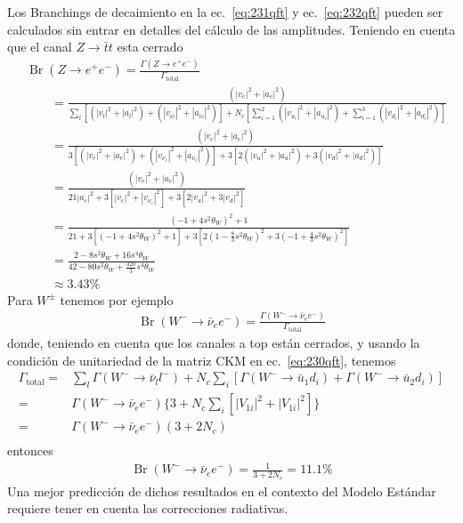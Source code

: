 \begin{frame}
Los Branchings de decaimiento en la ec.~\eqref{eq:231qft} y ec.~\eqref{eq:232qft}  pueden ser calculados sin entrar en detalles del cálculo de las amplitudes. Teniendo en cuenta que el canal $Z\to\bar{t}t$ esta cerrado
\begin{align}
  &\operatorname{Br}(Z\to e^+e^-)=\frac{\Gamma(Z\to e^+e^-)}{\Gamma_{\text{total}}}\nonumber\\
 &\qquad=\frac{(|v_e|^2+|a_e|^2)}{\sum_l[(|v_l|^2+|a_l|^2)+(|v_{\nu_l}|^2+|a_{\nu_l}|^2)]
+N_c[\sum_{i=1}^2(|v_{u_i}|^2+|a_{u_i}|^2)+\sum_{i=1}^3(|v_{d_i}|^2+|a_{d_i}|^2)]}\nonumber\\
 &\qquad=\frac{(|v_e|^2+|a_e|^2)}{3[(|v_e|^2+|a_e|^2)+(|v_{\nu_e}|^2+|a_{\nu_e}|^2)]
+3[2(|v_{u}|^2+|a_{u}|^2)+3(|v_{d}|^2+|a_{d}|^2)]}\nonumber\\
  &\qquad=\frac{(|v_e|^2+|a_e|^2)}{21|a_e|^2+3[|v_e|^2+|v_{\nu_e}|^2]
+3[2|v_{u}|^2+3|v_{d}|^2]}\nonumber\\
 &\qquad=\frac{(-1+4s^2\theta_W)^2+1}{21+3[(-1+4s^2\theta_W)^2+1]
+3[2(1-\frac{8}{3}s^2\theta_W)^2+3(-1+\frac{4}{3}s^2\theta_W)^2]}\nonumber\\
  &\qquad=\frac{2-8s^2\theta_W+16s^4\theta_W}{42-80s^2\theta_W+\frac{320}{3}s^4\theta_W}\nonumber\\
&\qquad\approx3.43\%
\end{align}
Para $W^\pm$ tenemos por ejemplo
\begin{align}
\operatorname{Br}(W^-\to\bar{\nu}_e e^-)=\frac{\Gamma(W^-\to\bar{\nu}_e e^-)}{\Gamma_{\text{total}}}
\end{align}
donde, teniendo en cuenta que los canales a top están cerrados, y usando la condición de unitariedad de la matriz CKM en ec.~\eqref{eq:230qft}, tenemos
\begin{align}
  \Gamma_{\text{total}}=&\sum_l\Gamma(W^-\to\bar{\nu}_l l^-)+N_c\sum_i[\Gamma(W^-\to\bar{u}_1d_i)+\Gamma(W^-\to\bar{u}_2d_i)]\nonumber\\
  =&\Gamma(W^-\to\bar{\nu}_e e^-)\{3+N_c\sum_i[|V_{1i}|^2+|V_{1i}|^2]\} \nonumber\\
  =&\Gamma(W^-\to\bar{\nu}_e e^-)(3+2N_c) \nonumber\\
\end{align}
entonces
\begin{align}
  \operatorname{Br}(W^-\to\bar{\nu}_e e^-)=\frac{1}{3+2N_c}=11.1\%
\end{align}
Una mejor predicción de dichos resultados en el contexto del Modelo Estándar requiere tener en cuenta las correcciones radiativas.



\end{frame}
